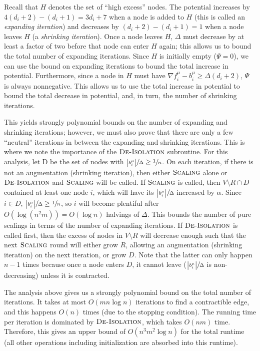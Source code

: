 \documentclass[11pt]{article}
\theoremstyle{definition}
\theoremstyle{definition}
\theoremstyle{definition}
\newcommand{\fu}{f^{\mu}}
\newcommand{\nfiu}{\nabla \fu_i}
\newcommand{\biu}{b_{i}^{\mu}}
\newcommand{\filtration}{\textsc{De-Isolation}}
\newcommand{\es}{\textsc{Scaling}}
\begin{document}
Recall that $H$ denotes the set of ``high excess'' nodes.
The potential increases by $4(d_i + 2) - (d_i + 1) = 3d_i + 7$ when a node is
added to $H$ (this is called an \textit{expanding iteration})
and decreases by $(d_i + 2) - (d_i + 1) = 1$
when a node leaves $H$ (a \textit{shrinking iteration}). Once a node leaves
$H$, $\Delta$ must decrease by at least a factor of two before that node can enter $H$ again; this allows us to
bound the total number of expanding iterations. Since $H$ is initially empty
($\Psi = 0$), we can use the bound on expanding iterations to bound the total increase in
potential. Furthermore, since a node in $H$ must have $\nfiu - \biu \geq \Delta(d_i + 2)$,
$\Psi$ is always nonnegative. This allows us to use the
total increase in potential to bound the total decrease in potential, and, in turn,
the number of shrinking iterations.

This yields strongly polynomial bounds on the number of expanding and
shrinking iterations; however, we must also prove that there are only a few
``neutral'' iterations in between the expanding and shrinking iterations.
This is where we note the importance of the $\filtration$
subroutine. For this analysis, let D be the set of nodes with
$\sfrac{\abs{b_i^\mu}}{\Delta} \geq \sfrac{1}{n}$.
On each iteration, if there is not an augmentation (shrinking iteration), then
either $\es$ alone or $\filtration$ and $\es$ will be called. If $\es$ is called, then
$V \setminus R \cap D$ contained at least one node $i$, which will have its
$\sfrac{\abs{b_i^\mu}}{\Delta}$ increased by $\alpha$. Since $i \in D$,
$\sfrac{\abs{b_i^\mu}}{\Delta} \geq \sfrac{1}{n}$, so $i$ will become plentiful
after $O(\log (n^2 m)) = O(\log n)$ halvings of $\Delta$. This bounds the
number of pure scalings in terms of the number of expanding iterations.
If $\filtration$ is called first, then the excess of nodes in $V \setminus R$
will decrease enough such that the next $\es$ round will either grow $R$, allowing an augmentation
(shrinking iteration) on the next iteration, or grow
$D$. Note that the latter can only
happen $n-1$ times because once a node enters $D$, it cannot leave
($\sfrac{\abs{b_i^\mu}}{\Delta}$ is non-decreasing) unless it is contracted.

The analysis above gives us a strongly polynomial bound on the total number of iterations. It takes at most $O(mn\log n)$ iterations to find a contractible edge, and this happens $O(n)$ times (due to the stopping condition). The running time per iteration is dominated by $\filtration$, which takes $O(nm)$ time. Therefore, this gives an upper bound of $O(n^3m^2\log n)$ for the total runtime (all other operations including initialization
are absorbed into this runtime).
\end{document}
